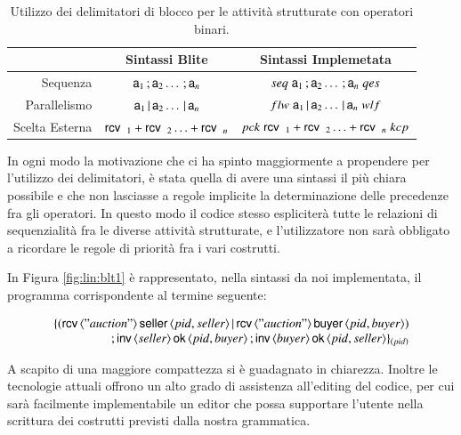 \begin{table}
\begin{center}
\begin{tabular}{|r|c|c|}
\hline
 & Sintassi Blite & Sintassi Implemetata \\
\hline
Sequenza & ${\sf a}_1 \, ; {\sf a}_2 \ldots \, ; {\sf a}_n $ & $seq \; {\sf a}_1 \, ;
{\sf a}_2 \ldots \, ; {\sf a}_n \; qes$ \\
\hline
Parallelismo & ${\sf a}_1 \,|\, {\sf a}_2 \ldots \,|\, {\sf a}_n $ & $flw \; {\sf a}_1 \,|\,
{\sf a}_2 \ldots \,|\, {\sf a}_n \; wlf$ \\
\hline
Scelta Esterna & ${\sf rcv}\,\, \,_1 + {\sf rcv}\,\, \,_2
\ldots + {\sf rcv}\,\, \,_n $ & $pck \; {\sf rcv}\,\, \,_1 + 
{\sf rcv}\,\, \,_2 \ldots + {\sf rcv}\,\, \,_n \; kcp$ \\
\hline
\end{tabular}
\caption[Delimitatori di blocco per le attività strutturate]{Utilizzo dei
delimitatori di blocco per le attività strutturate con operatori binari.}
\label{tab:blokmarks}
\end{center}
\end{table}

In ogni modo la motivazione che ci ha spinto maggiormente a propendere per
l'utilizzo dei delimitatori, è stata quella di avere una sintassi il più chiara
possibile e che non lasciasse a regole implicite la determinazione delle
precedenze fra gli operatori. In questo modo il codice stesso espliciterà tutte le
relazioni di sequenzialità fra le diverse attività strutturate, e l'utilizzatore non sarà
obbligato a ricordare le regole di priorità fra i vari costrutti.

In Figura \ref{fig:lin:blt1} è rappresentato, nella sintassi
da noi implementata, il programma corrispondente al termine seguente:

$$
\begin{array}{rl}
\{ 
(
	{\sf rcv}\,\langle "auction" \rangle \, {\sf seller}\, \langle pid, seller \rangle
	\,|\,
	{\sf rcv}\,\langle "auction" \rangle \, {\sf buyer}\, \langle pid, buyer \rangle 
)
\\
\, ; 
{\sf inv}\,\langle seller \rangle \,{\sf ok}\,\langle pid, buyer \rangle
\, ;
{\sf inv}\,\langle buyer \rangle \,{\sf ok}\,\langle pid, seller \rangle
 \}_{(pid)}
\end{array}
$$

A scapito di una maggiore compattezza si è guadagnato in chiarezza. Inoltre
le tecnologie attuali offrono un alto grado di assistenza all'editing del
codice, per cui sarà facilmente implementabile un editor che possa supportare
l'utente nella scrittura dei costrutti previsti dalla nostra grammatica.
\\

